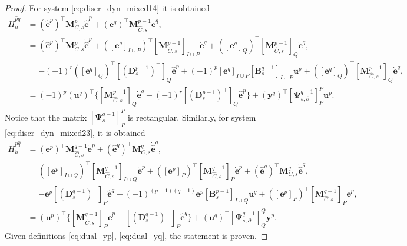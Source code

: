 \documentclass{elsarticle}
\newcommand*{\dual}[1]{\ensuremath{\widehat{#1}}}
\begin{document}
\begin{proof}
For system \eqref{eq:discr_dyn_mixed14} it is obtained
\begin{equation*}
\begin{aligned}
    \dot{H}_h^{\dual{p}q} &= (\dual{\mathbf{e}}^p)^\top \mathbf{M}^p_{C, s} \dot{\dual{\mathbf{e}}}^p + (\mathbf{e}^q)^\top \mathbf{M}^{p-1}_{\dual{C}, s} \dot{\mathbf{e}}^q, \\
    &= (\dual{\mathbf{e}}^p)^\top \mathbf{M}^p_{C, s} \dot{\dual{\mathbf{e}}}^p + ([\mathbf{e}^q]_{I\cup P})^\top [\mathbf{M}^{p-1}_{\dual{C}, s}]_{I\cup P} \dot{\mathbf{e}}^q + ([\mathbf{e}^q]_{Q})^\top [\mathbf{M}^{p-1}_{\dual{C}, s}]_{Q} \dot{\mathbf{e}}^q, \\
    &= -(-1)^r ([\mathbf{e}^q]_{Q})^\top [(\mathbf{D}_{s}^{p-1})^\top]_{Q} \dual{\mathbf{e}}^p  + (-1)^{p}[\mathbf{e}^q]_{I\cup P}[\mathbf{B}^{q-1}_{s}]_{I \cup P} \mathbf{u}^p + ([\mathbf{e}^q]_{Q})^\top [\mathbf{M}^{p-1}_{\dual{C}, s}]_{Q} \dot{\mathbf{e}}^q, \\
    &= (-1)^p(\mathbf{u}^q)^\top \{[\mathbf{M}^{p-1}_{\dual{C}, s}]_{Q} \dot{\mathbf{e}}^q  -(-1)^r[(\mathbf{D}_{s}^{p-1})^\top]_{Q} \dual{\mathbf{e}}^p\} + (\mathbf{y}^q)^\top[\mathbf{\Psi}^{q-1}_{s, \partial}]_{P}^{P} \mathbf{u}^p. 
\end{aligned}
\end{equation*}
Notice that the matrix $[\mathbf{\Psi}^{q-1}_{s}]_{P}^{P}$ is rectangular. Similarly, for system \eqref{eq:discr_dyn_mixed23}, it is obtained
\begin{equation*}
\begin{aligned}
    \dot{H}_h^{p\dual{q}} &= ({\mathbf{e}}^p)^\top \mathbf{M}^{q-1}_{\dual{C}, s} \dot{\mathbf{e}}^p + (\dual{\mathbf{e}}^q)^\top \mathbf{M}^q_{C, s} \dot{\dual{\mathbf{e}}}^q, \\  
    &=([{\mathbf{e}}^p]_{I\cup Q})^\top [\mathbf{M}^{q-1}_{\dual{C}, s}]_{I\cup Q} \dot{\mathbf{e}}^p + ([{\mathbf{e}}^p]_{P})^\top [\mathbf{M}^{q-1}_{\dual{C}, s}]_{P} \dot{\mathbf{e}}^p + (\dual{\mathbf{e}}^q)^\top \mathbf{M}^q_{C, s} \dot{\dual{\mathbf{e}}}^q,\\
    &=- \mathbf{e}^p[(\mathbf{D}_{s}^{q-1})^\top]_{P}\dual{\mathbf{e}}^q  + (-1)^{(p-1)(q-1)} \mathbf{e}^p [\mathbf{B}_{s}^{p-1}]_{I \cup Q} \mathbf{u}^q +  ([{\mathbf{e}}^p]_{P})^\top [\mathbf{M}^{q-1}_{\dual{C}, s}]_{P} \dot{\mathbf{e}}^p,\\
    &=(\mathbf{u}^p)^\top \{[\mathbf{M}^{q-1}_{\dual{C}, s}]_{P} \dot{\mathbf{e}}^p  -[(\mathbf{D}_{s}^{q-1})^\top]_{P} \dual{\mathbf{e}}^q\} + (\mathbf{u}^q)^\top[\mathbf{\Psi}^{q-1}_{s, \partial}]_{Q}^{Q} \mathbf{y}^p.
\end{aligned}
\end{equation*}
Given definitions \eqref{eq:dual_yp}, \eqref{eq:dual_yq}, the statement is proven. 
\end{proof}
\end{document}
